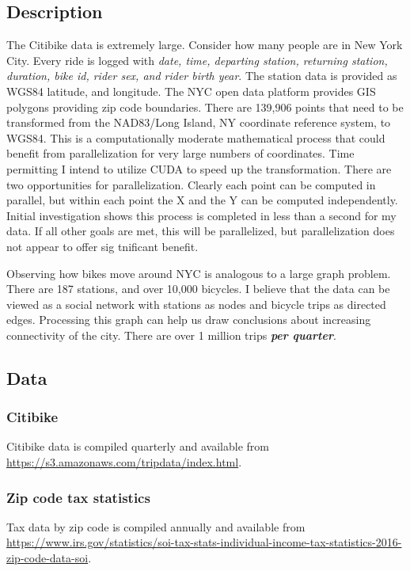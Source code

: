 \documentclass{article}
\begin{document}
\subsection{Description}
The Citibike data is extremely large. Consider how many people are in New York City. Every ride is logged with \textit{date, time, departing station, returning station, duration, bike id, rider sex, and rider birth year}. The station data is provided as WGS84 latitude, and longitude. The NYC open data platform provides GIS polygons providing zip code boundaries. There are 139,906 points that need to be transformed from the NAD83/Long Island, NY coordinate reference system, to WGS84. This is a computationally moderate mathematical process that could benefit from parallelization for very large numbers of coordinates. Time permitting I intend to utilize CUDA to speed up the transformation. There are two opportunities for parallelization. Clearly each point can be computed in parallel, but within each point the X and the Y can be computed independently. Initial investigation shows this process is completed in less than a second for my data. If all other goals are met, this will be parallelized, but parallelization does not appear to offer sig tnificant benefit.\par
Observing how bikes move around NYC is analogous to a large graph problem. There are 187 stations, and over 10,000 bicycles. I believe that the data can be viewed as a social network with stations as nodes and bicycle trips as directed edges. Processing this graph can help us draw conclusions about increasing connectivity of the city. There are over 1 million trips \textbf{\textit{per quarter}}.

\subsection{Data}
\subsubsection{Citibike}
Citibike data is compiled quarterly and available from \url{https://s3.amazonaws.com/tripdata/index.html}.

\subsubsection{Zip code tax statistics}
Tax data by zip code is compiled annually and available from \url{https://www.irs.gov/statistics/soi-tax-stats-individual-income-tax-statistics-2016-zip-code-data-soi}.
\end{document}
